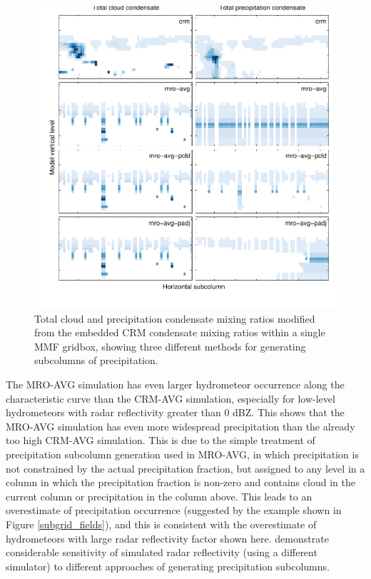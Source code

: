\documentclass[letter]{article}
\begin{document}
\begin{figure}
\centering
\includegraphics{test_subgrid_mro.pdf}
\caption{Total cloud and precipitation condensate mixing ratios modified from the embedded CRM condensate mixing ratios within a single MMF gridbox, showing three different methods for generating subcolumns of precipitation.}
\label{subgrid_fields_mro}
\end{figure}
The MRO-AVG simulation has even larger hydrometeor occurrence along the characteristic curve than the CRM-AVG simulation, especially for low-level hydrometeors with radar reflectivity greater than 0 dBZ. This shows that the MRO-AVG simulation has even more widespread precipitation than the already too high CRM-AVG simulation. This is due to the simple treatment of precipitation subcolumn generation used in MRO-AVG, in which precipitation is not constrained by the actual precipitation fraction, but assigned to any level in a column in which the precipitation fraction is non-zero and contains cloud in the current column or precipitation in the column above. This leads to an overestimate of precipitation occurrence (suggested by the example shown in Figure \ref{subgrid_fields}), and this is consistent with the overestimate of hydrometeors with large radar reflectivity factor shown here. \cite{dimichele_et_al_2012} demonstrate considerable sensitivity of simulated radar reflectivity (using a different simulator) to different approaches of generating precipitation subcolumns. 
\end{document}
